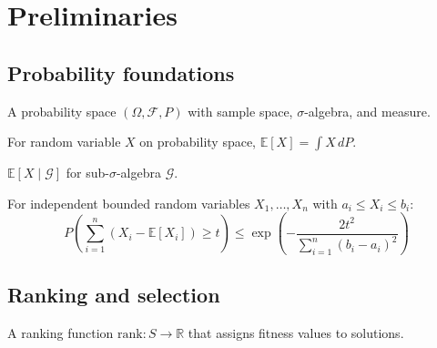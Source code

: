 
\chapter{Preliminaries}

\section{Probability foundations}
\begin{definition}
  \label{def:prob_space}
  A probability space $(\Omega, \mathcal{F}, P)$ with sample space, $\sigma$-algebra, and measure.
  \mathlibok
\end{definition}

\begin{definition}
  \label{def:expected_value}
  For random variable $X$ on probability space, $\mathbb{E}[X] = \int X \, dP$.
  \mathlibok
\end{definition}

\begin{definition}
  \label{def:conditional_expectation}
  $\mathbb{E}[X \mid \mathcal{G}]$ for sub-$\sigma$-algebra $\mathcal{G}$.
  \mathlibok
\end{definition}

\begin{lemma}
  \label{lem:hoeffding}
  For independent bounded random variables $X_1, \ldots, X_n$ with $a_i \leq X_i \leq b_i$:
  \[ P\left(\sum_{i=1}^n (X_i - \mathbb{E}[X_i]) \geq t\right) \leq \exp\left(-\frac{2t^2}{\sum_{i=1}^n (b_i - a_i)^2}\right) \]
  \leanok
\end{lemma}

\section{Ranking and selection}
\begin{definition}
  \label{def:ranking}
  A ranking function $\text{rank}: S \to \mathbb{R}$ that assigns fitness values to solutions.
\end{definition}

